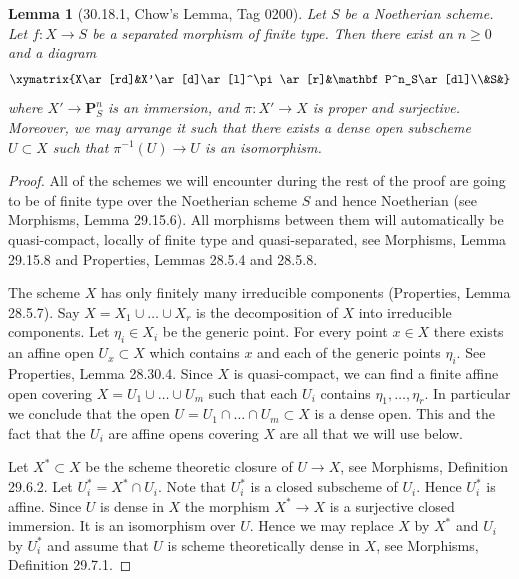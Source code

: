 \documentclass[UTF8,11pt]{ctexart}
\newtheorem*{lemma}{Lemma}
\theoremstyle{definition}
\begin{document}
\begin{lemma}[30.18.1, Chow's Lemma, Tag 0200]
Let $S$ be a Noetherian scheme. Let $f:X\to S$ be a separated morphism of finite type. Then there exist an $n\geq0$ and a diagram
\[
\xymatrix{X\ar[rd]&X'\ar[d]\ar[l]^\pi\ar[r]&\mathbf P^n_S\ar[dl]\\&S&}
\]
where $X'\to\mathbf P^n_S$ is an immersion, and $\pi:X'\to X$ is proper and surjective. Moreover, we may arrange it such that there exists a dense open subscheme $U\subset X$ such that $\pi^{-1}(U)\to U$ is an isomorphism.
\end{lemma}
\begin{proof}
All of the schemes we will encounter during the rest of the proof are going to be of finite type over the Noetherian scheme $S$ and hence Noetherian (see Morphisms, Lemma 29.15.6). All morphisms between them will automatically be quasi-compact, locally of finite type and quasi-separated, see Morphisms, Lemma 29.15.8 and Properties, Lemmas 28.5.4 and 28.5.8.

The scheme $X$ has only finitely many irreducible components (Properties, Lemma 28.5.7). Say $X=X_1\cup\ldots\cup X_r$ is the decomposition of $X$ into irreducible components. Let $\eta_i\in X_i$ be the generic point. For every point $x\in X$ there exists an affine open $U_x\subset X$ which contains $x$ and each of the generic points $\eta_i$. See Properties, Lemma 28.30.4. Since $X$ is quasi-compact, we can find a finite affine open covering $X=U_1\cup\ldots\cup U_m$ such that each $U_i$ contains $\eta_1,\ldots,\eta_r$. In particular we conclude that the open $U=U_1\cap\ldots\cap U_m\subset X$ is a dense open. This and the fact that the $U_i$ are affine opens covering $X$ are all that we will use below.

Let $X^*\subset X$ be the scheme theoretic closure of $U\to X$, see Morphisms, Definition 29.6.2. Let $U_i^*=X^*\cap U_i$. Note that $U_i^*$ is a closed subscheme of $U_i$. Hence $U_i^*$ is affine. Since $U$ is dense in $X$ the morphism $X^*\to X$ is a surjective closed immersion. It is an isomorphism over $U$. Hence we may replace $X$ by $X^*$ and $U_i$ by $U_i^*$ and assume that $U$ is scheme theoretically dense in $X$, see Morphisms, Definition 29.7.1.


\end{proof}
\end{document}
